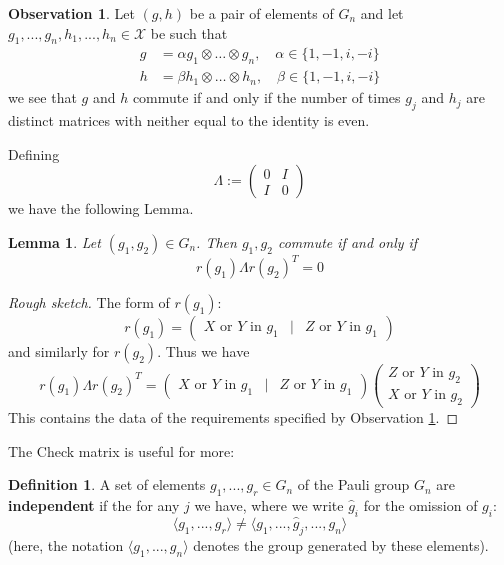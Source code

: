 \documentclass[12pt]{article}
\theoremstyle{plain}
\newtheorem{lemma}[thm]{Lemma}
\theoremstyle{definition}
\newtheorem{defn}[thm]{Definition} %
\newtheorem{observation}[thm]{Observation}
\newcommand{\scr}[1]{\mathscr{#1}}
\begin{document}
\begin{observation}\label{obs:evenness}
	Let $(g,h)$ be a pair of elements of $G_n$ and let $g_1,...,g_n, h_1,...,h_n \in \scr{X}$ be such that
	\begin{align*}
		g &= \alpha g_1 \otimes \hdots \otimes g_n,\quad \alpha \in \{ 1,-1,i,-i \}\\
		h &= \beta h_1 \otimes \hdots \otimes h_n,\quad \beta \in \{ 1,-1,i,-i \}
	\end{align*}
	we see that $g$ and $h$ commute if and only if the number of times $g_j$ and $h_j$ are distinct matrices with neither equal to the identity is even. 
\end{observation}
Defining
\begin{equation}
	\Lambda :=
	\begin{pmatrix}
		0 & I\\
		I & 0
	\end{pmatrix}
\end{equation}
we have the following Lemma.
\begin{lemma}
	Let $(g_1,g_2) \in G_n$. Then $g_1,g_2$ commute if and only if
	\begin{equation}
		r(g_1) \Lambda r(g_2)^T = 0
	\end{equation}
\end{lemma}
\begin{proof}[Rough sketch]
	The form of $r(g_1)$:
	\begin{equation}
		r(g_1) =
		\begin{pmatrix}
			X \text{ or } Y \text{ in }g_1 & | & Z \text{ or } Y\text{ in }g_1
		\end{pmatrix}
	\end{equation}
	and similarly for $r(g_2)$. Thus we have
	\begin{equation}
		r(g_1) \Lambda r(g_2)^T = \begin{pmatrix}
			X \text{ or } Y \text{ in }g_1 & | & Z \text{ or } Y\text{ in }g_1
		\end{pmatrix}
		\begin{pmatrix}
			Z \text{ or } Y \text{ in }g_2\\
			X \text{ or } Y \text{ in }g_2
		\end{pmatrix}
	\end{equation}
	This contains the data of the requirements specified by Observation \ref{obs:evenness}.
\end{proof}
The Check matrix is useful for more:
\begin{defn}
	A set of elements $g_1,...,g_r \in G_n$ of the Pauli group $G_n$ are \textbf{independent} if the for any $j$ we have, where we write $\hat{g}_i$ for the omission of $g_i$:
	\begin{equation}
		\langle g_1,...,g_r \rangle \neq \langle g_1,...,\hat{g}_j, ..., g_n\rangle
	\end{equation}
	(here, the notation $\langle g_1,...,g_n\rangle$ denotes the group generated by these elements).
\end{defn}
\end{document}
